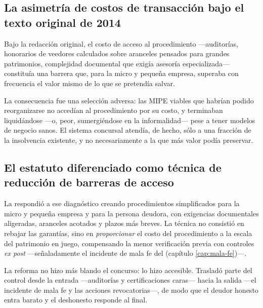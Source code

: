 \subsection{La asimetría de costos de transacción bajo el texto original de 2014}

Bajo la redacción original, el costo de acceso al procedimiento ---auditorías, honorarios de
veedores calculados sobre aranceles pensados para grandes patrimonios, complejidad documental
que exigía asesoría especializada--- constituía una barrera que, para la micro y pequeña
empresa, superaba con frecuencia el valor mismo de lo que se pretendía salvar.

La consecuencia fue una selección adversa: las MIPE viables que habrían podido reorganizarse
no accedían al procedimiento por su costo, y terminaban liquidándose ---o, peor, sumergiéndose
en la informalidad--- pese a tener modelos de negocio sanos. El sistema concursal atendía, de
hecho, sólo a una fracción de la insolvencia existente, y no necesariamente a la que más valor
podía preservar.

\subsection{El estatuto diferenciado como técnica de reducción de barreras de acceso}

La \Lreforma{} \citeyearpar{ley-21563} respondió a ese diagnóstico creando procedimientos
simplificados para la micro y pequeña empresa y para la persona deudora, con exigencias
documentales aligeradas, aranceles acotados y plazos más breves. La técnica no consistió en
rebajar las garantías, sino en \emph{proporcionar} el costo del procedimiento a la escala del
patrimonio en juego, compensando la menor verificación previa con controles \emph{ex post}
---señaladamente el incidente de mala fe del  (capítulo \ref{cap:mala-fe})---.

\begin{foco}
La reforma no hizo más blando el concurso: lo hizo accesible. Trasladó parte del control desde
la entrada ---auditorías y certificaciones caras--- hacia la salida ---el incidente de mala fe y
las acciones revocatorias---, de modo que el deudor honesto entra barato y el deshonesto
responde al final.
\end{foco}

\bloqueNormativo

